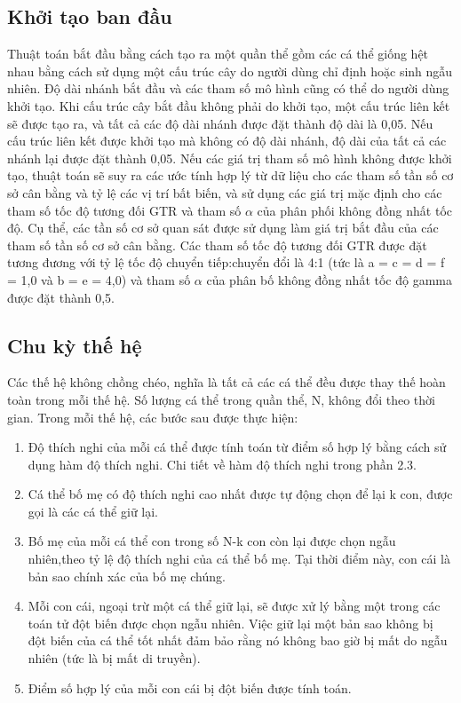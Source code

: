 \documentclass[12pt,a4paper]{report}
\begin{document}
\subsection{Khởi tạo ban đầu}

Thuật toán bắt đầu bằng cách tạo ra một quần thể gồm các cá thể giống hệt nhau bằng cách sử dụng một cấu trúc cây do người dùng chỉ định hoặc sinh ngẫu nhiên. Độ dài nhánh bắt đầu và các tham số mô hình cũng có thể do người dùng khởi tạo. Khi cấu trúc cây bắt đầu không phải do khởi tạo, một cấu trúc liên kết sẽ được tạo ra, và tất cả các độ dài nhánh được đặt thành độ dài là 0,05. Nếu cấu trúc liên kết được khởi tạo mà không có độ dài nhánh, độ dài của tất cả các nhánh lại được đặt thành 0,05. Nếu các giá trị tham số mô hình không được khởi tạo, thuật toán sẽ suy ra các ước tính hợp lý từ dữ liệu cho các tham số tần số cơ sở cân bằng và tỷ lệ các vị trí bất biến, và sử dụng các giá trị mặc định cho các tham số tốc độ tương đối GTR và tham số \(\alpha\) của phân phối không đồng nhất tốc độ. Cụ thể, các tần số cơ sở quan sát được sử dụng làm giá trị bắt đầu của các tham số tần số cơ sở cân bằng. Các tham số tốc độ tương đối GTR được đặt tương đương với tỷ lệ tốc độ chuyển tiếp:chuyển đổi là 4:1 (tức là a = c = d = f = 1,0 và b = e = 4,0) và tham số \(\alpha\) của phân bố không đồng nhất tốc độ gamma được đặt thành 0,5.

\subsection{Chu kỳ thế hệ}

Các thế hệ không chồng chéo, nghĩa là tất cả các cá thể đều được thay thế hoàn toàn trong mỗi thế hệ. Số lượng cá thể trong quần thể, N, không đổi theo thời gian. Trong mỗi thế hệ, các bước sau được thực hiện:


\begin{enumerate}
    \item Độ thích nghi của mỗi cá thể được tính toán từ điểm số hợp lý bằng cách sử dụng hàm độ thích nghi. Chi tiết về hàm độ thích nghi trong phần 2.3.
    \item Cá thể bố mẹ có độ thích nghi cao nhất được tự động chọn để lại k con, được gọi là các cá thể giữ lại. 
    \item Bố mẹ của mỗi cá thể con trong số N-k con còn lại được chọn ngẫu nhiên,theo tỷ lệ độ thích nghi của cá thể bố mẹ. Tại thời điểm này, con cái là bản sao chính xác của bố mẹ chúng.
    \item Mỗi con cái, ngoại trừ một cá thể giữ lại, sẽ được xử lý bằng một trong các toán tử đột biến được chọn ngẫu nhiên. Việc giữ lại một bản sao không bị đột biến của cá thể tốt nhất đảm bảo rằng nó không bao giờ bị mất do ngẫu nhiên (tức là bị mất di truyền).
    \item Điểm số hợp lý của mỗi con cái bị đột biến được tính toán.
\end{enumerate}
\end{document}
